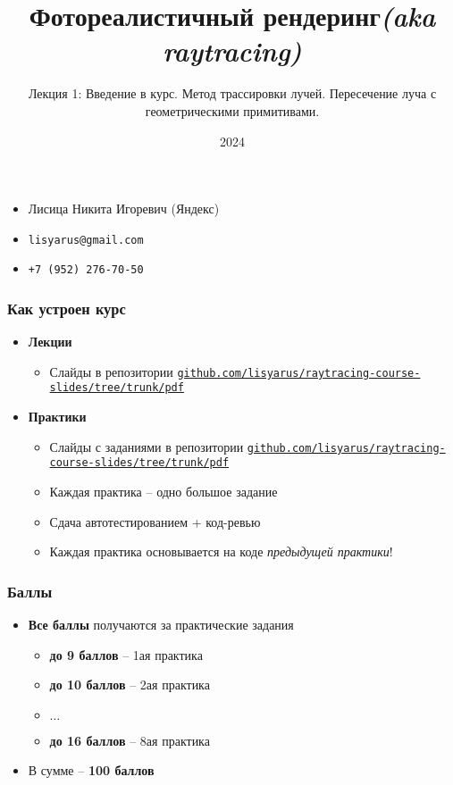 \documentclass[10pt,handout]{beamer}
\title{Фотореалистичный рендеринг\quad\quad\quad\quad\quad\quad \textit{(aka raytracing)}}
\subtitle{Лекция 1: Введение в курс. Метод трассировки лучей. Пересечение луча с геометрическими примитивами.}
\date{2024}
\begin{document}
\frame{\titlepage}

\begin{frame}
\frametitle{}
\begin{itemize}
\item Лисица Никита Игоревич (Яндекс)
\item \texttt{lisyarus@gmail.com}
\item \texttt{+7 (952) 276-70-50}
\end{itemize}
\end{frame}

\begin{frame}
\frametitle{Как устроен курс}
\begin{itemize}
\item \textbf{Лекции}
\begin{itemize}
\item Слайды в репозитории \href{https://github.com/lisyarus/raytracing-course-slides/tree/trunk/pdf}{\texttt{github.com/lisyarus/raytracing-course-slides/tree/trunk/pdf}}
\end{itemize}
\pause
\item \textbf{Практики}
\pause
\begin{itemize}
\item Слайды с заданиями в репозитории \href{https://github.com/lisyarus/raytracing-course-slides/tree/trunk/pdf}{\texttt{github.com/lisyarus/raytracing-course-slides/tree/trunk/pdf}}
\pause
\item Каждая практика -- одно большое задание
\pause
\item Сдача автотестированием + код-ревью
\pause
\item Каждая практика основывается на коде \textit{предыдущей практики}!
\end{itemize}
\end{itemize}
\end{frame}

\begin{frame}
\frametitle{Баллы}
\begin{itemize}
\pause
\item \textbf{Все баллы} получаются за практические задания
\pause
\begin{itemize}
\item \textbf{до 9 баллов} -- 1ая практика
\item \textbf{до 10 баллов} -- 2ая практика
\item \begin{math}\dots\end{math}
\item \textbf{до 16 баллов} -- 8ая практика
\end{itemize}
\pause
\item В сумме -- \textbf{100 баллов}
\end{itemize}
\end{frame}
\end{document}
